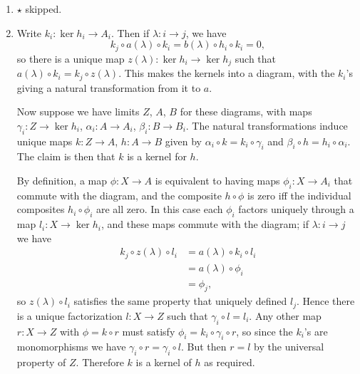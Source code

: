 \documentclass{report}
\begin{document}
\begin{enumerate}[label=\textbf{1.6.\Alph*.}]
	\item $\star$ skipped.

	\item Write $k_i:\ker h_i\to A_i$. Then if $\lambda:i\to j$, we have
	      \begin{equation*}
		      k_j\circ a(\lambda)\circ k_i = b(\lambda)\circ h_i\circ k_i = 0,
	      \end{equation*}
	      so there is a unique map $z(\lambda):\ker h_i\to\ker h_j$ such that
	      $a(\lambda)\circ k_i=k_j\circ z(\lambda)$. This makes the kernels into
	      a diagram, with the $k_i$'s giving a natural transformation from it to
	      $a$.

	      Now suppose we have limits $Z$, $A$, $B$ for these diagrams, with maps
	      $\gamma_i:Z\to\ker h_i$, $\alpha_i:A\to A_i$, $\beta_i:B\to B_i$. The
	      natural transformations induce unique maps $k:Z\to A$, $h:A\to B$
	      given by $\alpha_i\circ k=k_i\circ\gamma_i$ and
	      $\beta_i\circ h=h_i\circ\alpha_i$. The claim is then that $k$ is a
	      kernel for $h$.

	      By definition, a map $\phi:X\to A$ is equivalent to having maps
	      $\phi_i:X\to A_i$ that commute with the diagram, and the composite
	      $h\circ\phi$ is zero iff the individual composites $h_i\circ\phi_i$
	      are all zero. In this case each $\phi_i$ factors uniquely through a
	      map $l_i:X\to\ker h_i$, and these maps commute with the diagram; if
	      $\lambda:i\to j$ we have
	      \begin{align*}
		      k_j\circ z(\lambda)\circ l_i
		       & = a(\lambda)\circ k_i\circ l_i \\
		       & = a(\lambda)\circ\phi_i        \\
		       & = \phi_j,
	      \end{align*}
	      so $z(\lambda)\circ l_i$ satisfies the same property that uniquely
	      defined $l_j$. Hence there is a unique factorization $l:X\to Z$ such
	      that $\gamma_i\circ l=l_i$. Any other map $r:X\to Z$ with
	      $\phi=k\circ r$ must satisfy $\phi_i=k_i\circ\gamma_i\circ r$, so
	      since the $k_i$'s are monomorphisms we have
	      $\gamma_i\circ r=\gamma_i\circ l$. But then $r=l$ by the universal
	      property of $Z$. Therefore $k$ is a kernel of $h$ as required.


\end{enumerate}
\end{document}
